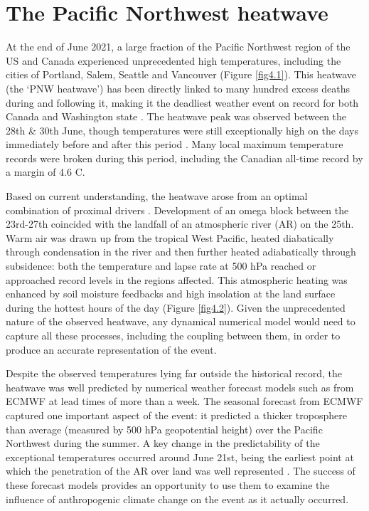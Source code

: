 \section{The Pacific Northwest heatwave}\label{ch4:heatwave}

  At the end of June 2021, a large fraction of the Pacific Northwest region of the US and Canada experienced unprecedented high temperatures, including the cities of Portland, Salem, Seattle and Vancouver (Figure \ref{fig4.1}). This heatwave (the `PNW heatwave') has been directly linked to many hundred excess deaths during and following it, making it the deadliest weather event on record for both Canada and Washington state \cite{henderson_analysis_2022}. The heatwave peak was observed between the 28th \& 30th June, though temperatures were still exceptionally high on the days immediately before and after this period \cite{menne_global_2012,menne_overview_2012}. Many local maximum temperature records were broken during this period, including the Canadian all-time record by a margin of 4.6 \textdegree{}C.

  Based on current understanding, the heatwave arose from an optimal combination of proximal drivers \cite{overland_causes_2021,lin_2021_2022,mo_anomalous_2022,white_unprecedented_2022}. Development of an omega block between the 23rd-27th coincided with the landfall of an atmospheric river (AR) on the 25th. Warm air was drawn up from the tropical West Pacific, heated diabatically through condensation in the river and then further heated adiabatically through subsidence: both the temperature and lapse rate at 500 hPa reached or approached record levels in the regions affected. This atmospheric heating was enhanced by soil moisture feedbacks \cite{thompson_2021_2022} and high insolation at the land surface during the hottest hours of the day (Figure \ref{fig4.2}). Given the unprecedented nature of the observed heatwave, any dynamical numerical model would need to capture all these processes, including the coupling between them, in order to produce an accurate representation of the event.
  
  Despite the observed temperatures lying far outside the historical record, the heatwave was well predicted by numerical weather forecast models such as from ECMWF at lead times of more than a week. The seasonal forecast from ECMWF captured one important aspect of the event: it predicted a thicker troposphere than average (measured by 500 hPa geopotential height) over the Pacific Northwest during the summer. A key change in the predictability of the exceptional temperatures occurred around June 21st, being the earliest point at which the penetration of the AR over land was well represented \cite{mo_anomalous_2022}. The success of these forecast models provides an opportunity to use them to examine the influence of anthropogenic climate change on the event as it actually occurred.

